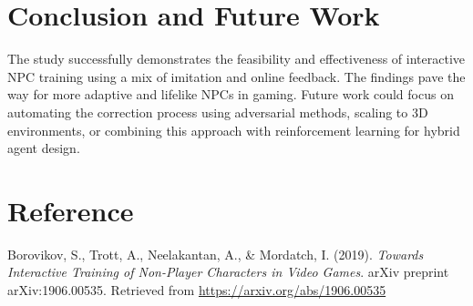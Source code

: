 \documentclass[12pt,a4paper]{article}
\begin{document}
\section*{Conclusion and Future Work}

The study successfully demonstrates the feasibility and effectiveness of interactive NPC training using a mix of imitation and online feedback. The findings pave the way for more adaptive and lifelike NPCs in gaming. Future work could focus on automating the correction process using adversarial methods, scaling to 3D environments, or combining this approach with reinforcement learning for hybrid agent design.

\section*{Reference}

\noindent Borovikov, S., Trott, A., Neelakantan, A., \& Mordatch, I. (2019). \textit{Towards Interactive Training of Non-Player Characters in Video Games}. arXiv preprint arXiv:1906.00535. Retrieved from \url{https://arxiv.org/abs/1906.00535}
\end{document}
